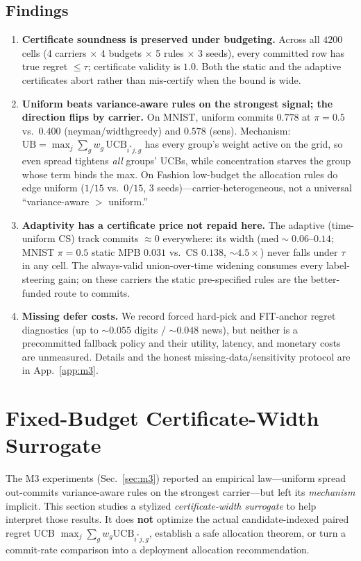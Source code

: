 \documentclass{article}
\begin{document}
\subsection{Findings}
\begin{enumerate}
\item \textbf{Certificate soundness is preserved under budgeting.} Across all $4200$ cells
(4 carriers $\times$ 4 budgets $\times$ 5 rules $\times$ 3 seeds), every committed row has
true regret $\le\tau$; certificate validity is $1.0$. Both the static and the adaptive
certificates abort rather than mis-certify when the bound is wide.
\item \textbf{Uniform beats variance-aware rules on the strongest signal; the direction flips
by carrier.} On MNIST, uniform commits $0.778$ at $\pi{=}0.5$ vs.\ $0.400$ (neyman/widthgreedy)
and $0.578$ (sens). Mechanism: $\mathrm{UB}=\max_j\sum_g w_g\,\mathrm{UCB}_{i^*j,g}$ has every
group's weight active on the grid, so even spread tightens \emph{all} groups' UCBs, while
concentration starves the group whose term binds the max. On Fashion low-budget the
allocation rules do edge uniform ($1/15$ vs.\ $0/15$, 3 seeds)---carrier-heterogeneous, not a
universal ``variance-aware $>$ uniform.''
\item \textbf{Adaptivity has a certificate price not repaid here.} The adaptive (time-uniform
CS) track commits $\approx0$ everywhere: its width ($\mathrm{med}\sim0.06$--$0.14$; MNIST
$\pi{=}0.5$ static MPB $0.031$ vs.\ CS $0.138$, $\sim4.5\times$) never falls under $\tau$ in
any cell. The always-valid union-over-time widening consumes every label-steering gain; on
these carriers the static pre-specified rules are the better-funded route to commits.
\item \textbf{Missing defer costs.} We record forced hard-pick and FIT-anchor regret
diagnostics (up to $\sim0.055$ digits / $\sim0.048$ news), but neither is a precommitted
fallback policy and their utility, latency, and monetary costs are unmeasured. Details and the
honest missing-data/sensitivity protocol are in App.~\ref{app:m3}.
\end{enumerate}

\section{Fixed-Budget Certificate-Width Surrogate}
\label{sec:m35}

The M3 experiments (Sec.~\ref{sec:m3}) reported an empirical law---uniform spread
out-commits variance-aware rules on the strongest carrier---but left its \emph{mechanism}
implicit. This section studies a stylized \emph{certificate-width surrogate} to help interpret
those results. It does \textbf{not} optimize the actual candidate-indexed paired regret UCB
$\max_j\sum_g w_g\mathrm{UCB}_{i^*j,g}$, establish a safe allocation theorem, or turn a
commit-rate comparison into a deployment allocation recommendation.
\end{document}
